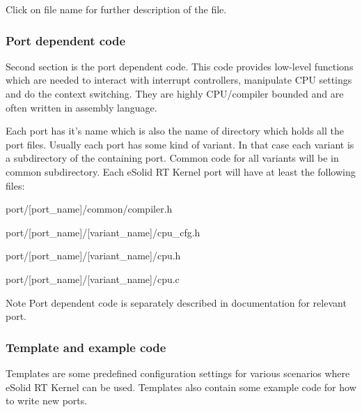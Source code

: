 Click on file name for further description of the file.\hypertarget{files_org_files_dcode}{}\subsubsection{Port dependent code}\label{files_org_files_dcode}
Second section is the port dependent code. This code provides low-\/level functions which are needed to interact with interrupt controllers, manipulate C\-P\-U settings and do the context switching. They are highly C\-P\-U/compiler bounded and are often written in assembly language.

Each port has it's name which is also the name of directory which holds all the port files. Usually each port has some kind of variant. In that case each variant is a subdirectory of the containing port. Common code for all variants will be in common subdirectory. Each e\-Solid R\-T Kernel port will have at least the following files\-:
\begin{DoxyItemize}
\item {\ttfamily port/\mbox{[}port\-\_\-name\mbox{]}/common/compiler.h}
\item {\ttfamily port/\mbox{[}port\-\_\-name\mbox{]}/\mbox{[}variant\-\_\-name\mbox{]}/cpu\-\_\-cfg.h}
\item {\ttfamily port/\mbox{[}port\-\_\-name\mbox{]}/\mbox{[}variant\-\_\-name\mbox{]}/cpu.h}
\item {\ttfamily port/\mbox{[}port\-\_\-name\mbox{]}/\mbox{[}variant\-\_\-name\mbox{]}/cpu.c}
\end{DoxyItemize}

\begin{DoxyNote}{Note}
Port dependent code is separately described in documentation for relevant port. 
\end{DoxyNote}
\hypertarget{files_org_files_template}{}\subsubsection{Template and example code}\label{files_org_files_template}
Templates are some predefined configuration settings for various scenarios where e\-Solid R\-T Kernel can be used. Templates also contain some example code for how to write new ports.

